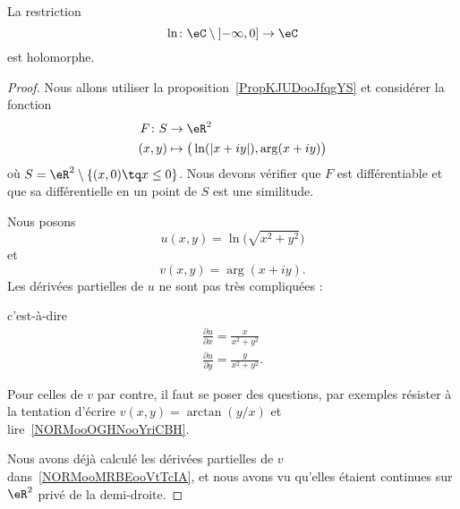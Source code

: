 \begin{theorem}     \label{THOooWUXOooYKvLbJ}
    La restriction
    \begin{equation}
        \ln\colon \eC\setminus\mathopen] -\infty , 0 \mathclose]\to \eC
    \end{equation}
    est holomorphe.
\end{theorem}

\begin{proof}
    Nous allons utiliser la proposition~\ref{PropKJUDooJfqgYS} et considérer la fonction
    \begin{equation}
        \begin{aligned}
            F\colon S&\to \eR^2 \\
            (x,y)&\mapsto \big( \ln(| x+iy |),\arg(x+iy) \big)
        \end{aligned}
    \end{equation}
    où \( S=\eR^2\setminus\{ (x,0)\tq x\leq 0 \}\). Nous devons vérifier que \( F\) est différentiable et que sa différentielle en un point de \( S\) est une similitude.

    Nous posons
    \begin{equation}
        u(x,y)=\ln\big( \sqrt{ x^2+y^2 } \big)
    \end{equation}
    et
    \begin{equation}
        v(x,y)=\arg(x+iy).
    \end{equation}
    Les dérivées partielles de \( u\) ne sont pas très compliquées :
    
    c'est-à-dire
    \begin{subequations}
        \begin{align}
            \frac{ \partial u }{ \partial x }=\frac{ x }{ x^2+y^2 }\\
            \frac{ \partial u }{ \partial y }=\frac{ y }{ x^2+y^2 }.
        \end{align}
    \end{subequations}

    Pour celles de \( v \) par contre, il faut se poser des questions, par exemples résister à la tentation d'écrire \( v(x,y)=\arctan(y/x)\) et lire~\ref{NORMooOGHNooYriCBH}.

    Nous avons déjà calculé les dérivées partielles de \( v\) dans~\ref{NORMooMRBEooVtTcIA}, et nous avons vu qu'elles étaient continues sur \( \eR^2\) privé de la demi-droite.


\end{proof}
